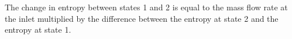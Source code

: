 The change in entropy between states 1 and 2 is equal to the mass flow rate at the inlet multiplied by the difference between the entropy at state 2 and the entropy at state 1.